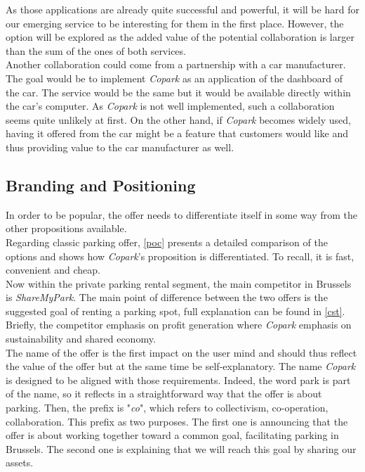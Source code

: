 \documentclass[12pt,a4paper,oneside]{book}
\newcommand{\bp}{\textit{Copark}}
\begin{document}
As those applications are already quite successful and powerful, it will be hard for our emerging service to be interesting for them in the first place. However, the option will be explored as the added value of the potential collaboration is larger than the sum of the ones of both services.\\

Another collaboration could come from a partnership with a car manufacturer. The goal would be to implement \bp{} as an application of the dashboard of the car. The service would be the same but it would be available directly within the car's computer. As \bp{} is not well implemented, such a collaboration seems quite unlikely at first. On the other hand, if \bp{} becomes widely used, having it offered from the car might be a feature that customers would like and thus providing value to the car manufacturer as well.

\subsection{Branding and Positioning}

In order to be popular, the offer needs to differentiate itself in some way from the other propositions available.\\

Regarding classic parking offer, \autoref{poc} presents a detailed comparison of the options and shows how \bp{}'s proposition is differentiated. To recall, it is fast, convenient and cheap.\\

Now within the private parking rental segment, the main competitor in Brussels is \textit{ShareMyPark}. The main point of difference between the two offers is the suggested goal of renting a parking spot, full explanation can be found in \autoref{cst}. Briefly, the competitor emphasis on profit generation where \bp{} emphasis on sustainability and shared economy.\\

The name of the offer is the first impact on the user mind and should thus reflect the value of the offer but at the same time be self-explanatory. The name \bp{} is designed to be aligned with those requirements. Indeed, the word park is part of the name, so it reflects in a straightforward way that the offer is about parking. Then, the prefix is "\textit{co}", which refers to collectivism, co-operation, collaboration. This prefix as two purposes. The first one is announcing that the offer is about working together toward a common goal, facilitating parking in Brussels. The second one is explaining that we will reach this goal by sharing our assets.\\
\end{document}
